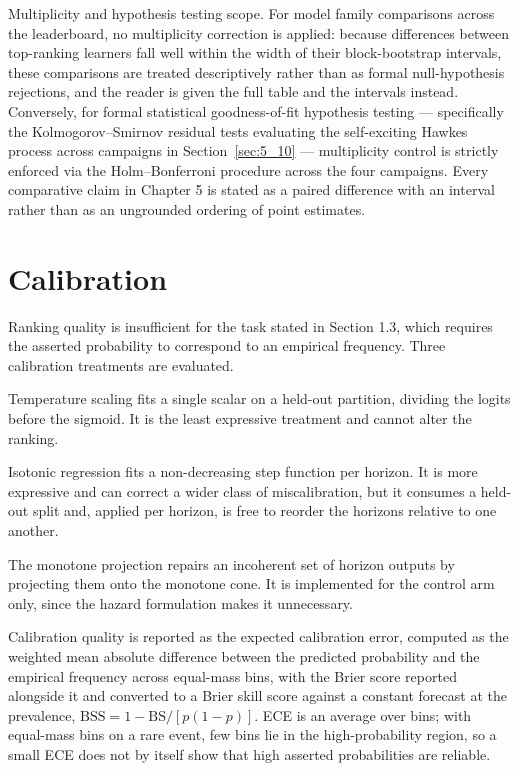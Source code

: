 Multiplicity and hypothesis testing scope. For model family comparisons across the leaderboard, no multiplicity correction is applied: because differences between top-ranking learners fall well within the width of their block-bootstrap intervals, these comparisons are treated descriptively rather than as formal null-hypothesis rejections, and the reader is given the full table and the intervals instead. Conversely, for formal statistical goodness-of-fit hypothesis testing --- specifically the Kolmogorov--Smirnov residual tests evaluating the self-exciting Hawkes process across campaigns in Section~\ref{sec:5_10} --- multiplicity control is strictly enforced via the Holm--Bonferroni procedure across the four campaigns. Every comparative claim in Chapter 5 is stated as a paired difference with an interval rather than as an ungrounded ordering of point estimates.


\section{Calibration}
\label{sec:4_8}

Ranking quality is insufficient for the task stated in Section 1.3, which requires the asserted probability to correspond to an empirical frequency. Three calibration treatments are evaluated.

Temperature scaling \cite{ref33} fits a single scalar on a held-out partition, dividing the logits before the sigmoid. It is the least expressive treatment and cannot alter the ranking.

Isotonic regression \cite{ref34} fits a non-decreasing step function per horizon. It is more expressive and can correct a wider class of miscalibration, but it consumes a held-out split and, applied per horizon, is free to reorder the horizons relative to one another.

The monotone projection repairs an incoherent set of horizon outputs by projecting them onto the monotone cone. It is implemented for the control arm only, since the hazard formulation makes it unnecessary.

Calibration quality is reported as the expected calibration error, computed as the weighted mean absolute difference between the predicted probability and the empirical frequency across equal-mass bins, with the Brier score reported alongside it and converted to a Brier skill score against a constant forecast at the prevalence, $\text{BSS} = 1 - \text{BS}/[p(1-p)]$. ECE is an average over bins; with equal-mass bins on a rare event, few bins lie in the high-probability region, so a small ECE does not by itself show that high asserted probabilities are reliable.


